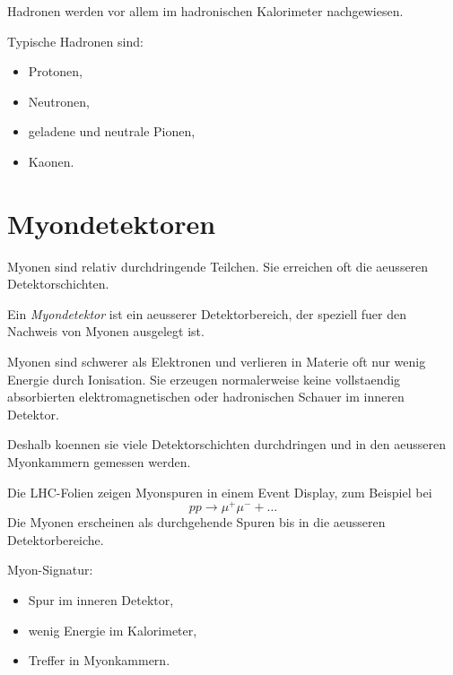 \begin{examtipbox}
Hadronen werden vor allem im hadronischen Kalorimeter nachgewiesen.

Typische Hadronen sind:
\begin{itemize}
    \item Protonen,
    \item Neutronen,
    \item geladene und neutrale Pionen,
    \item Kaonen.
\end{itemize}
\end{examtipbox}

\section{Myondetektoren}

Myonen sind relativ durchdringende Teilchen.
Sie erreichen oft die aeusseren Detektorschichten.

\begin{definitionbox}
Ein \emph{Myondetektor} ist ein aeusserer Detektorbereich, der speziell fuer den
Nachweis von Myonen ausgelegt ist.
\end{definitionbox}

\begin{conceptbox}
Myonen sind schwerer als Elektronen und verlieren in Materie oft nur wenig Energie
durch Ionisation.
Sie erzeugen normalerweise keine vollstaendig absorbierten elektromagnetischen oder
hadronischen Schauer im inneren Detektor.

Deshalb koennen sie viele Detektorschichten durchdringen und in den aeusseren
Myonkammern gemessen werden.
\end{conceptbox}

\begin{notebox}
Die LHC-Folien zeigen Myonspuren in einem Event Display, zum Beispiel bei
\[
    pp \rightarrow \mu^+ \mu^- + \ldots
\]
Die Myonen erscheinen als durchgehende Spuren bis in die aeusseren Detektorbereiche.
\end{notebox}

\begin{examtipbox}
Myon-Signatur:
\begin{itemize}
    \item Spur im inneren Detektor,
    \item wenig Energie im Kalorimeter,
    \item Treffer in Myonkammern.
\end{itemize}
\end{examtipbox}

